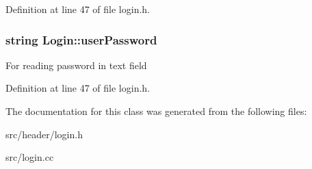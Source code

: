 Definition at line 47 of file login.\-h.

\hypertarget{classLogin_a9731be126468f535f161f045c95687c6}{
\subsubsection[{user\-Password}]{\setlength{\rightskip}{0pt plus 5cm}string Login\-::user\-Password\hspace{0.3cm}{\ttfamily [protected]}}}\label{classLogin_a9731be126468f535f161f045c95687c6}
For reading password in text field 

Definition at line 47 of file login.\-h.



The documentation for this class was generated from the following files\-:\begin{DoxyCompactItemize}
\item 
src/header/login.\-h\item 
src/login.\-cc\end{DoxyCompactItemize}
